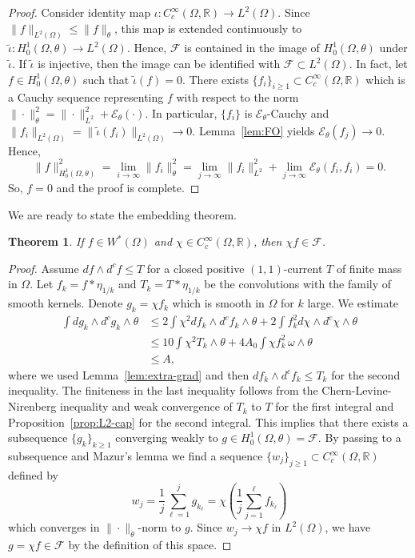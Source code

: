 \documentclass{amsart}
\newcommand{\wt}[1]{\widetilde{#1}}
\newcommand{\om}{\omega}
\newcommand{\te}{\theta}
\newcommand{\io}{\iota}
\newcommand{\Om}{\Omega}
\newcommand{\cF}{\mathcal{F}}
\newcommand{\bR}{\mathbb{R}}
\newcommand{\cali}[1]{\mathscr{#1}}
\newcommand{\Ec}{\cali{E}}
\newtheorem{thm}{Theorem}
\theoremstyle{definition}
\numberwithin{thm}{section}
\numberwithin{equation}{section}
\renewcommand{\[}{\begin{equation}}
\renewcommand{\]}{\end{equation}}
\newcommand{\wed}{\wedge}
\begin{document}
\begin{proof}   Consider identity map $\io : C^\infty_c(\Om,\bR) \to L^2(\Om)$.  Since $\|f\|_{L^2(\Om)} \leq \|f\|_\te$, this map is extended  continuously to $\wt\io: H^{1}_0(\Om, \te) \to L^2(\Om)$. Hence,  $\cF$ is contained in  the image of $H^1_0(\Om, \te)$ under $\wt\io$.
If  $\wt\io$ is injective, then the image can be identified with $\cF \subset L^2(\Om)$. In fact, let $f\in H_0^1(\Om,\te)$ such that $\wt\io (f) =0$. There exists $\{f_i\}_{i\geq 1} \subset C^\infty_c(\Om,\bR)$ which is a  Cauchy sequence representing $f$ with respect to the norm $\| \cdot\|_\te^2 = \| \cdot \|_{L^2}^2 + \Ec_\te(\cdot)$. In particular,  $\{f_i\}$ is $\Ec_\te$-Cauchy and 
$
	\|f_i\|_{L^2(\Om)} = \|\wt\io (f_i ) \|_{L^2(\Om)} \to 0.
$
Lemma~\ref{lem:FO} yields $\Ec_\te( f_j) \to 0$. Hence, 
$$
	\|f\|^2_{H^1_0(\Om,\te)}=	\lim_{i\to \infty} \| f_i \|^2_\te = \lim_{j\to \infty} \|f_i\|_{L^2}^2 + \lim_{j\to \infty} \Ec_\te( f_i, f_i) =0.
$$
 So, $f=0$ and the proof is complete.
\end{proof}

We are ready to state the embedding theorem.

\begin{thm} \label{thm:embedding} If $f \in W^*(\Om)$ and $\chi \in C^\infty_c(\Om,\bR)$, then $\chi  f \in \cF$.
\end{thm}

\begin{proof} Assume $df \wed d^c f\leq T$ for a closed positive $(1,1)$-current $T$ of finite mass in $\Om$.  Let $f_k = f*\eta_{1/k}$ and $T_k = T*\eta_{1/k}$ be the convolutions with the family of smooth kernels. Denote $g_k = \chi f_k$ which is smooth in $\Om$ for $k$ large. We estimate
$$\begin{aligned}
	\int d g_k \wed d^c g_k \wed \te 
&\leq 2 \int \chi^2 df_k \wed d^c f_k \wed \te + 2 \int f^2_k d\chi \wed d^c \chi \wed \te \\
&\leq 10 \int \chi^2 T_k \wed \te + 4A_0 \int \chi f^2_k \, \om\wed\te\\
&\leq A,
\end{aligned}$$
where we used Lemma~\ref{lem:extra-grad} and then $df_k \wed d^c f_k \leq T_k$ for the second inequality. 
The finiteness in the last inequality follows from the Chern-Levine-Nirenberg inequality and weak convergence of $T_k$ to $T$ for the first integral and Proposition~\ref{prop:L2-cap} for the second integral. 
This implies that there exists a subsequence $\{g_k\}_{k\geq 1}$ converging weakly to $g \in H^1_0(\Om,\te) = \cF$. By passing to a subsequence  and Mazur's lemma \cite[Theorem~2, page 120]{Yo80}  we find a sequence $\{w_j\}_{j\geq 1} \subset C^\infty_c(\Om,\bR)$ defined by
$$
	w_j = \frac{1}{j} \sum_{\ell =1}^j g_{k_\ell} = \chi  \left( \frac{1}{j}\sum_{j=1}^\ell f_{k_\ell} \right)
$$
which converges in $\| \cdot \|_\te$-norm to $g$. Since $w_j \to \chi f $ in $L^2(\Om)$, we have $g = \chi f \in \cF$ by the definition of this space.
\end{proof}
\end{document}
